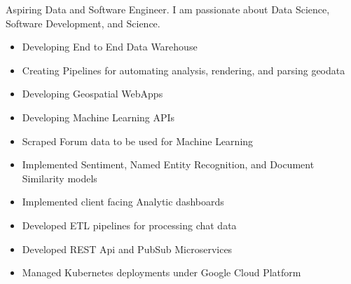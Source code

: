 \documentclass[10pt,a4paper]{altacv}
\begin{document}

\begin{fullwidth}
  \makecvheader

\end{fullwidth}


Aspiring Data and Software Engineer. I am passionate about Data Science, Software Development, and Science.



\begin{itemize}
  \item Developing End to End Data Warehouse
  \item Creating Pipelines for automating analysis, rendering, and parsing geodata
  \item Developing Geospatial WebApps
  \item Developing Machine Learning APIs
\end{itemize}

\divider

\begin{itemize}
  \item Scraped Forum data to be used for Machine Learning
  \item Implemented Sentiment, Named Entity Recognition, and Document Similarity models
  \item Implemented client facing Analytic dashboards
  \item Developed ETL pipelines for processing chat data
  \item Developed REST Api and PubSub Microservices
  \item Managed Kubernetes deployments under Google Cloud Platform
\end{itemize}
\end{document}
